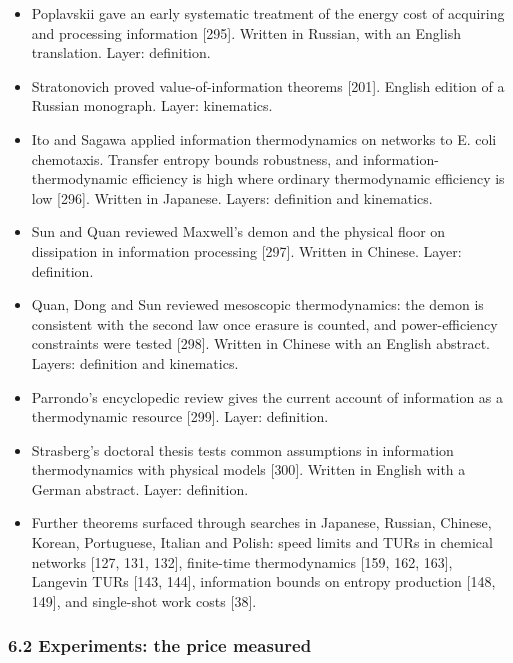 \documentclass[
  10pt,
]{article}
\providecommand{\tightlist}{%
  \setlength{\itemsep}{0pt}\setlength{\parskip}{0pt}}
\begin{document}
\begin{itemize}
\tightlist
\item
  Poplavskii gave an early systematic treatment of the energy cost of
  acquiring and processing information {[}295{]}. Written in Russian,
  with an English translation. Layer: definition.
\item
  Stratonovich proved value-of-information theorems {[}201{]}. English
  edition of a Russian monograph. Layer: kinematics.
\item
  Ito and Sagawa applied information thermodynamics on networks to E.
  coli chemotaxis. Transfer entropy bounds robustness, and
  information-thermodynamic efficiency is high where ordinary
  thermodynamic efficiency is low {[}296{]}. Written in Japanese.
  Layers: definition and kinematics.
\item
  Sun and Quan reviewed Maxwell's demon and the physical floor on
  dissipation in information processing {[}297{]}. Written in Chinese.
  Layer: definition.
\item
  Quan, Dong and Sun reviewed mesoscopic thermodynamics: the demon is
  consistent with the second law once erasure is counted, and
  power-efficiency constraints were tested {[}298{]}. Written in Chinese
  with an English abstract. Layers: definition and kinematics.
\item
  Parrondo's encyclopedic review gives the current account of
  information as a thermodynamic resource {[}299{]}. Layer: definition.
\item
  Strasberg's doctoral thesis tests common assumptions in information
  thermodynamics with physical models {[}300{]}. Written in English with
  a German abstract. Layer: definition.
\item
  Further theorems surfaced through searches in Japanese, Russian,
  Chinese, Korean, Portuguese, Italian and Polish: speed limits and TURs
  in chemical networks {[}127, 131, 132{]}, finite-time thermodynamics
  {[}159, 162, 163{]}, Langevin TURs {[}143, 144{]}, information bounds
  on entropy production {[}148, 149{]}, and single-shot work costs
  {[}38{]}.
\end{itemize}

\subsubsection{6.2 Experiments: the price
measured}\label{experiments-the-price-measured}
\end{document}
